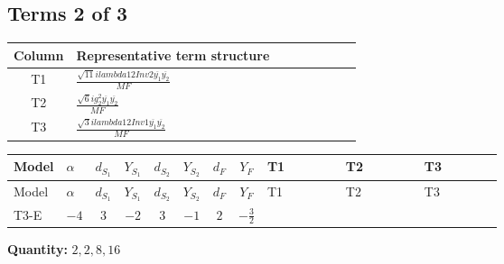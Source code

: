 \documentclass[8pt]{article}
\begin{document}
\begin{landscape}
\subsection*{Terms 2 of 3}
\begin{center}
\begin{tabular}{@{}c >{\raggedright\arraybackslash}p{0.82\linewidth}@{}}
\toprule
Column & Representative term structure \\
\midrule
T1 & \(\displaystyle \frac{\sqrt{11} i lambda12Inv2 \overline{y_{1}} \overline{y_{2}}}{MF}\) \\
\midrule
T2 & \(\displaystyle \frac{\sqrt{6} i g_{2}^{2} \overline{y_{1}} \overline{y_{2}}}{MF}\) \\
\midrule
T3 & \(\displaystyle \frac{\sqrt{3} i lambda12Inv1 \overline{y_{1}} \overline{y_{2}}}{MF}\) \\
\midrule
\bottomrule
\end{tabular}
\end{center}
\smallskip
\tiny
\begin{longtable}{@{}llcccccc >{\raggedright\arraybackslash}p{0.21\linewidth} >{\raggedright\arraybackslash}p{0.21\linewidth} >{\raggedright\arraybackslash}p{0.21\linewidth}@{}}
\toprule
Model & $\alpha$ & $d_{S_1}$ & $Y_{S_1}$ & $d_{S_2}$ & $Y_{S_2}$ & $d_F$ & $Y_F$ & T1 & T2 & T3 \\
\midrule
\endfirsthead
\toprule
Model & $\alpha$ & $d_{S_1}$ & $Y_{S_1}$ & $d_{S_2}$ & $Y_{S_2}$ & $d_F$ & $Y_F$ & T1 & T2 & T3 \\
\midrule
\endhead
T3-E & $-4$ & $3$ & $-2$ & $3$ & $-1$ & $2$ & $-\frac{3}{2}$ & \scriptsize\adjustbox{max width=\linewidth}{$\begin{gathered} - \frac{3 \sqrt{11} i lambda12Inv2 \overline{y_{1}} \overline{y_{2}}}{22 MF}\end{gathered}$} & \scriptsize\adjustbox{max width=\linewidth}{$\begin{gathered} - \frac{\sqrt{6} i g_{2}^{2} \overline{y_{1}} \overline{y_{2}}}{3 MF}\end{gathered}$} & \scriptsize\adjustbox{max width=\linewidth}{$\begin{gathered} \frac{\sqrt{3} i lambda12Inv1 \overline{y_{1}} \overline{y_{2}}}{6 MF}\end{gathered}$} \\
\midrule
\bottomrule
\end{longtable}
\clearpage
\noindent\textbf{Quantity: }$\mathrm{2,2,8,16}$\par\smallskip

\end{landscape}
\end{document}
